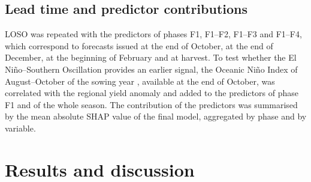 \documentclass[pdflatex,sn-basic]{sn-jnl}
\begin{document}
\subsection{Lead time and predictor contributions}\label{sec:lead}
LOSO was repeated with the predictors of phases F1, F1--F2, F1--F3 and F1--F4, which correspond to forecasts issued at the end of October, at the end of December, at the beginning of February and at harvest. To test whether the El Niño--Southern Oscillation provides an earlier signal, the Oceanic Niño Index of August--October of the sowing year \citep{noaa_oni}, available at the end of October, was correlated with the regional yield anomaly and added to the predictors of phase F1 and of the whole season. The contribution of the predictors was summarised by the mean absolute SHAP value \citep{lundberg2017} of the final model, aggregated by phase and by variable.


\section{Results and discussion}\label{sec:rd}
\end{document}
